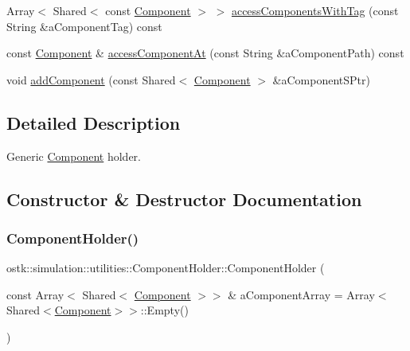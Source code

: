 \begin{DoxyCompactItemize}
\item 
Array$<$ Shared$<$ const \hyperlink{classostk_1_1simulation_1_1_component}{Component} $>$ $>$ \hyperlink{classostk_1_1simulation_1_1utilities_1_1_component_holder_a8dd785dcaa575278edd76cd14a245e1d}{access\+Components\+With\+Tag} (const String \&a\+Component\+Tag) const
\item 
const \hyperlink{classostk_1_1simulation_1_1_component}{Component} \& \hyperlink{classostk_1_1simulation_1_1utilities_1_1_component_holder_a0ab33e5a3ae44d8be3690f56a7780951}{access\+Component\+At} (const String \&a\+Component\+Path) const
\item 
void \hyperlink{classostk_1_1simulation_1_1utilities_1_1_component_holder_a6126f9412580307762b172837ecfd469}{add\+Component} (const Shared$<$ \hyperlink{classostk_1_1simulation_1_1_component}{Component} $>$ \&a\+Component\+S\+Ptr)
\end{DoxyCompactItemize}


\subsection{Detailed Description}
Generic \hyperlink{classostk_1_1simulation_1_1_component}{Component} holder. 

\subsection{Constructor \& Destructor Documentation}
\mbox{\label{classostk_1_1simulation_1_1utilities_1_1_component_holder_a8c55b3d1233adaa5363893de07b44c40}} 
\subsubsection{\texorpdfstring{Component\+Holder()}{ComponentHolder()}\hspace{0.1cm}{\footnotesize\ttfamily [1/2]}}
{\footnotesize\ttfamily ostk\+::simulation\+::utilities\+::\+Component\+Holder\+::\+Component\+Holder (\begin{DoxyParamCaption}\item[{const Array$<$ Shared$<$ \hyperlink{classostk_1_1simulation_1_1_component}{Component} $>$$>$ \&}]{a\+Component\+Array = {\ttfamily Array$<$Shared$<$\hyperlink{classostk_1_1simulation_1_1_component}{Component}$>$$>$\+:\+:Empty()} }\end{DoxyParamCaption})}

